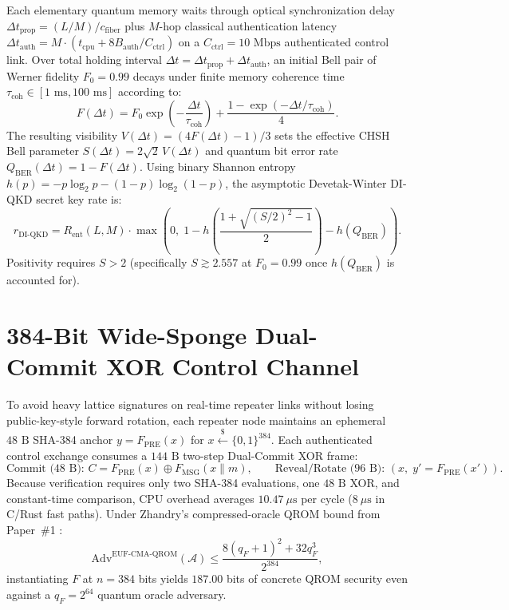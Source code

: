 \documentclass[conference,compsoc]{IEEEtran}
\begin{document}
Each elementary quantum memory waits through optical synchronization delay $\Delta t_{\text{prop}} = (L/M)/c_{\text{fiber}}$ plus $M$-hop classical authentication latency $\Delta t_{\text{auth}} = M \cdot (t_{\text{cpu}} + 8 B_{\text{auth}} / C_{\text{ctrl}})$ on a $C_{\text{ctrl}} = 10\text{ Mbps}$ authenticated control link. Over total holding interval $\Delta t = \Delta t_{\text{prop}} + \Delta t_{\text{auth}}$, an initial Bell pair of Werner fidelity $F_0 = 0.99$ decays under finite memory coherence time $\tau_{\text{coh}} \in [1\text{ ms}, 100\text{ ms}]$ according to:
\begin{equation}
F(\Delta t) = F_0 \exp\!\left(-\frac{\Delta t}{\tau_{\text{coh}}}\right) + \frac{1 - \exp(-\Delta t / \tau_{\text{coh}})}{4}.
\end{equation}
The resulting visibility $V(\Delta t) = (4F(\Delta t) - 1)/3$ sets the effective CHSH Bell parameter $S(\Delta t) = 2\sqrt{2}\,V(\Delta t)$ and quantum bit error rate $Q_{\text{BER}}(\Delta t) = 1 - F(\Delta t)$. Using binary Shannon entropy $h(p) = -p\log_2 p - (1-p)\log_2(1-p)$, the asymptotic Devetak-Winter DI-QKD secret key rate is:
\begin{equation}
r_{\text{DI-QKD}} = R_{\text{ent}}(L, M) \cdot \max\!\left(0,\; 1 - h\!\left(\frac{1 + \sqrt{(S/2)^2 - 1}}{2}\right) - h(Q_{\text{BER}})\right).
\end{equation}
Positivity requires $S > 2$ (specifically $S \gtrsim 2.557$ at $F_0 = 0.99$ once $h(Q_{\text{BER}})$ is accounted for).

\section{384-Bit Wide-Sponge Dual-Commit XOR Control Channel}
\label{sec:aqmp384}

To avoid heavy lattice signatures on real-time repeater links without losing public-key-style forward rotation, each repeater node maintains an ephemeral $48\text{ B}$ SHA-384 anchor $y = F_{\text{PRE}}(x)$ for $x \xleftarrow{\$} \{0,1\}^{384}$. Each authenticated control exchange consumes a $144\text{ B}$ two-step Dual-Commit XOR frame:
\begin{equation}
\text{Commit (48 B): } C = F_{\text{PRE}}(x) \oplus F_{\text{MSG}}(x \parallel m), \qquad \text{Reveal/Rotate (96 B): } (x,\; y' = F_{\text{PRE}}(x')).
\end{equation}
Because verification requires only two SHA-384 evaluations, one $48\text{ B}$ XOR, and constant-time comparison, CPU overhead averages $10.47\ \mu\text{s}$ per cycle ($8\ \mu\text{s}$ in C/Rust fast paths). Under Zhandry's compressed-oracle QROM bound from Paper~\#1 \cite{aqmp1}:
\begin{equation}
\mathrm{Adv}^{\mathrm{EUF\text{-}CMA\text{-}QROM}}(\mathcal{A}) \le \frac{8(q_F + 1)^2 + 32 q_F^3}{2^{384}},
\end{equation}
instantiating $F$ at $n = 384$ bits yields $187.00$ bits of concrete QROM security even against a $q_F = 2^{64}$ quantum oracle adversary.
\end{document}
